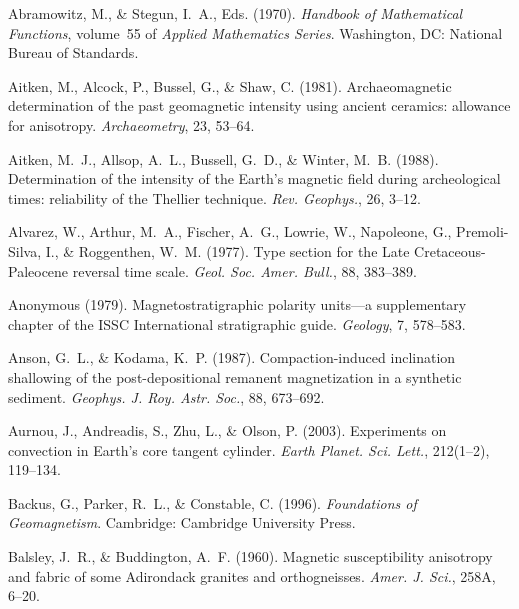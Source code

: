 \documentclass[,plain]{tauxe}
\begin{document}
\setcounter{page}{463}


\begin{thebibliography}{}

\bibitem{}%
Abramowitz, M., \& Stegun, I.~A., Eds. (1970). {\it Handbook of Mathematical Functions}, volume~55 of {\it Applied Mathematics Series}. Washington, DC: National Bureau of Standards.

\bibitem{}%
Aitken, M., Alcock, P., Bussel, G., \& Shaw, C. (1981). Archaeomagnetic determination of the past geomagnetic intensity using ancient ceramics: allowance for anisotropy. {\it Archaeometry}, 23, 53--64.

\bibitem{}%
Aitken, M.~J., Allsop, A.~L., Bussell, G.~D., \& Winter, M.~B. (1988). Determination of the intensity of the Earth's magnetic field during archeological times: reliability of the Thellier technique. {\it Rev. Geophys.}, 26, 3--12.

\bibitem{}%
Alvarez, W., Arthur, M.~A., Fischer, A.~G., Lowrie, W., Napoleone, G., Premoli-Silva, I., \& Roggenthen, W.~M. (1977). Type section for the Late Cretaceous-Paleocene reversal time scale. {\it Geol. Soc. Amer. Bull.}, 88, 383--389.

\bibitem{}%
Anonymous (1979). Magnetostratigraphic polarity units---a supplementary chapter of the {ISSC} International stratigraphic guide. {\it Geology}, 7, 578--583.

\bibitem{}%
Anson, G.~L., \& Kodama, K.~P. (1987). Compaction-induced inclination shallowing of the post-depositional remanent magnetization in a synthetic sediment. {\it Geophys. J. Roy. Astr. Soc.}, 88, 673--692.

\bibitem{}%
Aurnou, J., Andreadis, S., Zhu, L., \& Olson, P. (2003). Experiments on convection in Earth's core tangent cylinder. {\it Earth Planet. Sci. Lett.}, 212(1--2), 119--134.

\bibitem{}%
Backus, G., Parker, R.~L., \& Constable, C. (1996). {\it Foundations of Geomagnetism}. Cambridge: Cambridge University Press.

\bibitem{}%
Balsley, J.~R., \& Buddington, A.~F. (1960). Magnetic susceptibility anisotropy and fabric of some Adirondack granites and orthogneisses. {\it Amer. J. Sci.}, 258A, 6--20.


\end{thebibliography}
\end{document}

